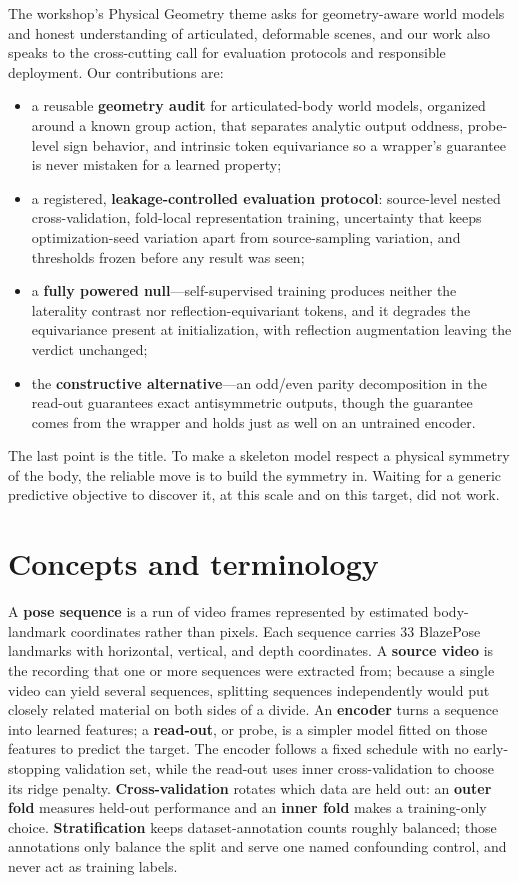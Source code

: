 \documentclass{article}
\begin{document}
The workshop's Physical Geometry theme asks for geometry-aware world models and honest understanding of articulated, deformable scenes, and our work also speaks to the cross-cutting call for evaluation protocols and responsible deployment. Our contributions are:
\begin{itemize}
  \item a reusable \textbf{geometry audit} for articulated-body world models, organized around a known group action, that separates analytic output oddness, probe-level sign behavior, and intrinsic token equivariance so a wrapper's guarantee is never mistaken for a learned property;
  \item a registered, \textbf{leakage-controlled evaluation protocol}: source-level nested cross-validation, fold-local representation training, uncertainty that keeps optimization-seed variation apart from source-sampling variation, and thresholds frozen before any result was seen;
  \item a \textbf{fully powered null}---self-supervised training produces neither the laterality contrast nor reflection-equivariant tokens, and it degrades the equivariance present at initialization, with reflection augmentation leaving the verdict unchanged;
  \item the \textbf{constructive alternative}---an odd/even parity decomposition in the read-out guarantees exact antisymmetric outputs, though the guarantee comes from the wrapper and holds just as well on an untrained encoder.
\end{itemize}
The last point is the title. To make a skeleton model respect a physical symmetry of the body, the reliable move is to build the symmetry in. Waiting for a generic predictive objective to discover it, at this scale and on this target, did not work.

\section{Concepts and terminology}

A \textbf{pose sequence} is a run of video frames represented by estimated body-landmark coordinates rather than pixels. Each sequence carries 33 BlazePose landmarks with horizontal, vertical, and depth coordinates. A \textbf{source video} is the recording that one or more sequences were extracted from; because a single video can yield several sequences, splitting sequences independently would put closely related material on both sides of a divide. An \textbf{encoder} turns a sequence into learned features; a \textbf{read-out}, or probe, is a simpler model fitted on those features to predict the target. The encoder follows a fixed schedule with no early-stopping validation set, while the read-out uses inner cross-validation to choose its ridge penalty. \textbf{Cross-validation} rotates which data are held out: an \textbf{outer fold} measures held-out performance and an \textbf{inner fold} makes a training-only choice. \textbf{Stratification} keeps dataset-annotation counts roughly balanced; those annotations only balance the split and serve one named confounding control, and never act as training labels.
\end{document}
